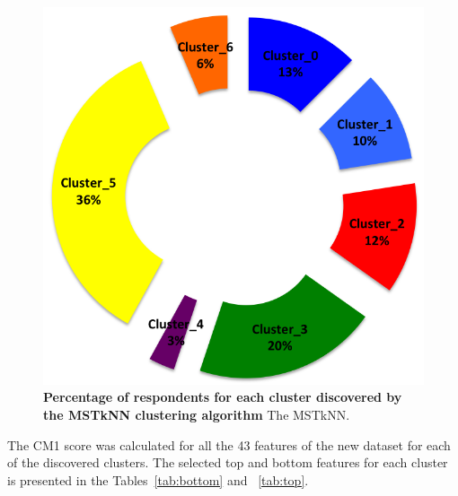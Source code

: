 \documentclass{article}
\begin{document}
\begin{figure}[h]
	\includegraphics[scale=0.5]{Clusters.png}
	\caption{\textbf{Percentage of respondents for each cluster discovered by the
	MSTkNN clustering algorithm} The MSTkNN.}
	\label{fig:Clusters}
\end{figure}

The CM1 score was calculated for all the 43 features of the new dataset
for each of the discovered clusters. The selected top and bottom features for
each cluster is presented in the Tables~\ref{tab:bottom} and ~\ref{tab:top}.
\end{document}
